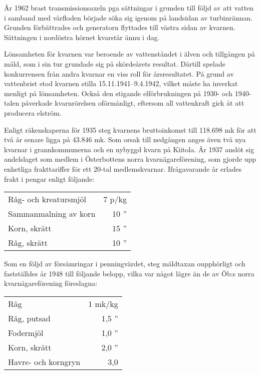 År 1962 brast transmissionsaxeln pga sättningar i grunden till följd av att vatten i samband med vårfloden började söka sig igenom på landsidan av turbinrännan. Grunden förbättrades och generatorn flyttades till västra sidan av kvarnen. Sättningen i nordöstra hörnet kvarstår ännu i dag.

Lönsamheten för kvarnen var beroende av vattenståndet i älven och tillgången på mäld, som i sin tur grundade sig på skördeårets resultat. Därtill spelade konkurrensen från andra kvarnar en viss roll för årsresultatet. På grund av vattenbrist stod kvarnen stilla 15.11.1941--9.4.1942, vilket måste ha inverkat menligt på lönsamheten. Också den stigande elförbrukningen på 1930- och 1940-talen påverkade kvarnrörelsen oförmånligt, eftersom all vattenkraft gick åt att producera elström.

Enligt räkenskaperna för 1935 steg kvarnens bruttoinkomst till 118.698 mk för att två år senare ligga på 43.846 mk. Som orsak till nedgången anges även två nya kvarnar i grannkommunerna och en nybyggd kvarn på Kiitola. År 1937 anslöt sig andelslaget som medlem i Österbottens norra kvarnägareförening, som gjorde upp enhetliga frakttariffer för ett 20-tal medlemskvarnar. Ifrågavarande år erlades frakt i pengar enligt följande:

\begin{center}
  \begin{tabular}{l r}
    \hline
    Råg- och kreatursmjöl & 7  p/kg \\
    Sammanmalning av korn	&	10 '' \\
    Korn, skrätt &	15 '' \\
    Råg, skrätt	&	10 '' \\
    \hline
  \end{tabular}
\end{center}

Som en följd av försämringar i penningvärdet, steg mäldtaxan oupphörligt och fastställdes år 1948 till följande belopp, vilka var något lägre än de av Öb:s norra kvarnägareförening föreslagna:

\begin{center}
  \begin{tabular}{l r}
    \hline
    Råg & 1 mk/kg \\
    Råg, putsad & 1,5 '' \\
    Fodermjöl & 1,0 '' \\
    Korn, skrätt & 2,0 '' \\
    Havre- och korngryn & 3,0 \\
    \hline
  \end{tabular}
\end{center}

